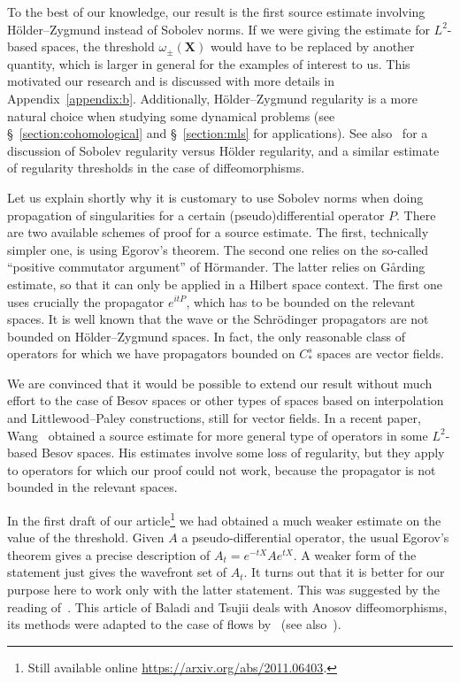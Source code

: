 \documentclass[AHL,Unicode,longabstracts,published]{cedram}
\newcommand{\X}{\mathbf{X}}
\begin{document}
To the best of our knowledge, our result is the first source estimate involving H\"older--Zygmund instead of Sobolev norms. If we were giving the estimate for $L^2$-based spaces, the threshold $\omega_{\pm}(\X)$ would have to be replaced by another quantity, which is larger in general for the examples of interest to us. This motivated our research and is discussed with more details in Appendix~\ref{appendix:b}. Additionally, H\"older--Zygmund regularity is a more natural choice when studying some dynamical problems (see \S~\ref{section:cohomological} and \S~\ref{section:mls} for applications). See also~\cite{dlLLave-2001} for a discussion of Sobolev regularity versus H\"older regularity, and a similar estimate of regularity thresholds in the case of diffeomorphisms.

Let us explain shortly why it is customary to use Sobolev norms when doing propagation of singularities for a certain (pseudo)differential operator $P$. There are two available schemes of proof for a source estimate. The first, technically simpler one, is using Egorov's theorem. The second one relies on the so-called ``positive commutator argument'' of H\"ormander. The latter relies on G{\r a}rding estimate, so that it can only be applied in a Hilbert space context. The first one uses crucially the propagator $e^{itP}$, which has to be bounded on the relevant spaces. It is well known that the wave or the Schr\"odinger propagators are not bounded on H\"older--Zygmund spaces. In fact, the only reasonable class of operators for which we have propagators bounded on $C^s_\ast$ spaces are vector fields.

We are convinced that it would be possible to extend our result without much effort to the case of Besov spaces or other types of spaces based on interpolation and Littlewood--Paley constructions, still for vector fields. In a recent paper, Wang~\cite{Wang-20} obtained a source estimate for more general type of operators in some $L^2$-based Besov spaces. His estimates involve some loss of regularity, but they apply to operators for which our proof could not work, because the propagator is not bounded in the relevant spaces.

In the first draft of our article\footnote{Still available online \url{https://arxiv.org/abs/2011.06403}.} we had obtained a much weaker estimate on the value of the threshold. Given $A$ a pseudo-differential operator, the usual Egorov's theorem gives a precise description of $A_t = e^{-tX}Ae^{tX}$. A weaker form of the statement just gives the wavefront set of $A_t$. It turns out that it is better for our purpose here to work only with the latter statement. This was suggested by the reading of~\cite{Baladi-Tsujii-07}. This article of Baladi and Tsujii deals with Anosov diffeomorphisms, its methods were adapted to the case of flows by~\cite{Adam-19} (see also~\cite{Adam-Baladi-2021}).
\end{document}
